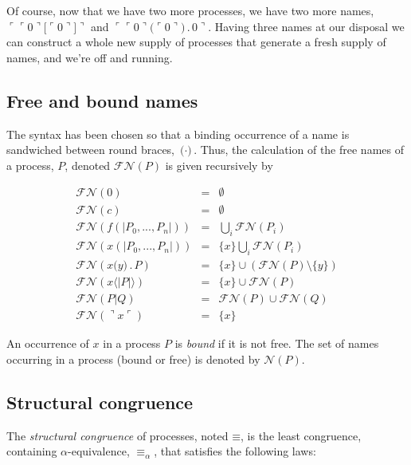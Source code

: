 \documentclass[]{entcs}
\newcommand{\lliftb}{\langle\!|}
\newcommand{\rliftb}{|\!\rangle}
\newcommand{\lfunb}{(\!|}
\newcommand{\rfunb}{|\!)}
\newcommand{\lpquote}{\ulcorner}
\newcommand{\rpquote}{\urcorner}
\newcommand{\id}[1]{\texttt{#1}}
\newcommand{\pzero}{\mathbin{0}}
\newcommand{\juxtap}{\mathbin{\id{|}}}
\newcommand{\concat}{\mathbin{.}}
\newcommand{\scong}{\mathbin{\equiv}}
\newcommand{\alphaeq}{\mathbin{\equiv_{\alpha}}}
\newcommand{\names}[1]{\mathbin{\mathcal{N}(#1)}}
\newcommand{\freenames}[1]{\mathbin{\mathcal{FN}(#1)}}
\newcommand{\binpar}[2]{#1 \juxtap #2}
\newcommand{\lift}[2]{#1 \lliftb #2 \rliftb}
\newcommand{\fun}[2]{#1 \lfunb #2 \rfunb}
\newcommand{\quotep}[1]{\lpquote #1 \rpquote}
\newcommand{\dropn}[1]{\rpquote #1 \lpquote}
\begin{document}
Of course, now that we have two more processes, we have two more
names, $\quotep{\quotep{0}\id{[}{\quotep{0}}\id{]}}$ and
$\quotep{\quotep{0}\id{(}{\quotep{0}}\id{)} \concat 0}$. Having three
names at our disposal we can construct a whole new supply of processes
that generate a fresh supply of names, and we're off and running. 

\subsection{Free and bound names}

The syntax has been chosen so that a binding occurrence of a name is
sandwiched between round braces, $\id{(} \cdot \id{)}$. Thus, the
calculation of the free names of a process, $P$, denoted
$\freenames{P}$ is given recursively by

	\begin{eqnarray}
		\freenames{\pzero} & = & \emptyset \nonumber\\
		\freenames{c} & = & \emptyset \nonumber\\
		\freenames{\fun{f}{P_0,...,P_n}} & = & \bigcup_i \freenames{P_i} \nonumber\\
		\freenames{\fun{x}{P_0,...,P_n}} & = & \{ x \} \bigcup_i \freenames{P_i} \nonumber\\
		\freenames{x \id{(}y\id{)} \concat P} & = & \{ x \} \cup (\freenames{P} \setminus \{ y \}) \nonumber\\
		\freenames{\lift{x}{P}} & = & \{ x \} \cup \freenames{P} \nonumber\\
		\freenames{\binpar{P}{Q}} & = & \freenames{P} \cup \freenames{Q} \nonumber\\
		\freenames{\dropn{x}} & = & \{ x \} \nonumber
	\end{eqnarray}

An occurrence of $x$ in a process $P$ is \textit{bound} if it is not
free. The set of names occurring in a process (bound or free) is
denoted by $\names{P}$.

\subsection{Structural congruence}

The {\em structural congruence} of processes, noted $\scong$, is the
least congruence, containing $\alpha$-equivalence, $\alphaeq$, that
satisfies the following laws:
\end{document}
